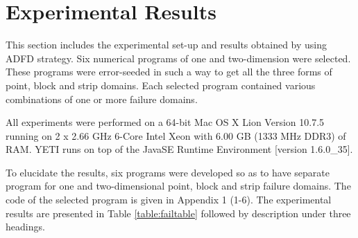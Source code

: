 \section{Experimental Results} \label{sec:experimentalResults}
This section includes the experimental set-up and results obtained by using ADFD strategy. Six numerical programs of one and two-dimension were selected. These programs were error-seeded in such a way to get all the three forms of point, block and strip domains. Each selected program contained various combinations of one or more failure domains. 

All experiments were performed on a 64-bit Mac OS X Lion Version 10.7.5 running on 2 x 2.66 GHz 6-Core Intel Xeon with 6.00 GB (1333 MHz DDR3) of RAM. YETI runs on top of the Java\texttrademark  SE Runtime Environment [version 1.6.0\_35]. 

To elucidate the results, six programs were developed so as to have separate program for one and two-dimensional point, block and strip failure domains. The code of the selected program is given in Appendix 1 (1-6). The experimental results are presented in Table \ref{table:failtable} followed by description under three headings.


